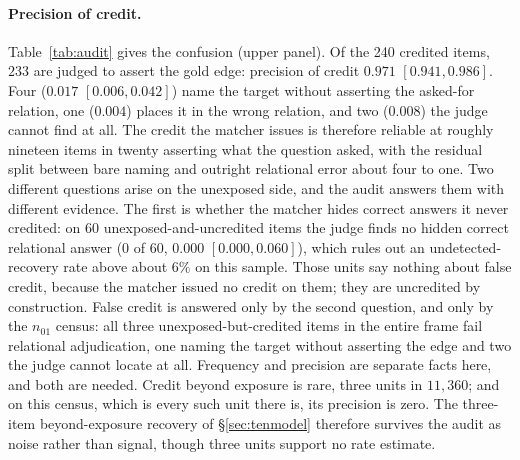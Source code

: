 \documentclass[10pt,twocolumn]{article}
\begin{document}
\paragraph{Precision of credit.} Table~\ref{tab:audit} gives the confusion (upper panel). Of the 240 credited items, $233$ are judged to assert the gold edge: precision of credit $\mathbf{0.971}$ $[0.941,0.986]$. Four ($0.017$ $[0.006,0.042]$) name the target without asserting the asked-for relation, one ($0.004$) places it in the wrong relation, and two ($0.008$) the judge cannot find at all. The credit the matcher issues is therefore reliable at roughly nineteen items in twenty asserting what the question asked, with the residual split between bare naming and outright relational error about four to one. Two different questions arise on the unexposed side, and the audit answers them with different evidence. The first is whether the matcher hides correct answers it never credited: on 60 unexposed-and-uncredited items the judge finds no hidden correct relational answer ($0$ of $60$, $0.000$ $[0.000,0.060]$), which rules out an undetected-recovery rate above about $6\%$ on this sample. Those units say nothing about false credit, because the matcher issued no credit on them; they are uncredited by construction. False credit is answered only by the second question, and only by the $n_{01}$ census: all three unexposed-but-credited items in the entire frame fail relational adjudication, one naming the target without asserting the edge and two the judge cannot locate at all. Frequency and precision are separate facts here, and both are needed. Credit beyond exposure is rare, three units in $11{,}360$; and on this census, which is every such unit there is, its precision is zero. The three-item beyond-exposure recovery of \S\ref{sec:tenmodel} therefore survives the audit as noise rather than signal, though three units support no rate estimate.
\end{document}
